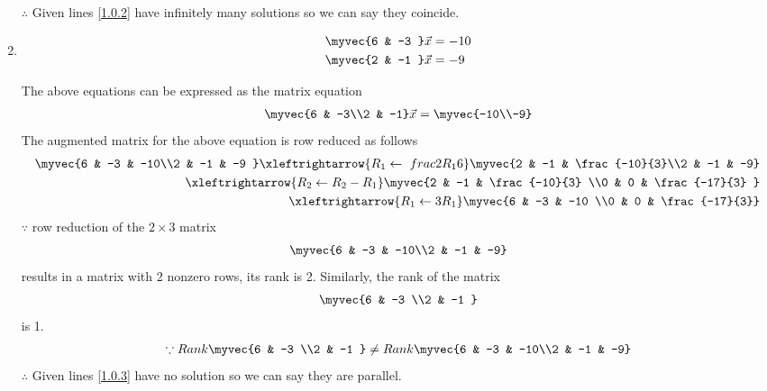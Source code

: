 \documentclass[journal,12pt,twocolumn]{IEEEtran}
\begin{document}
\begin{enumerate}
$\therefore$ Given lines \eqref{1.0.2} have infinitely many solutions so we can say they coincide.


\item
\begin{align}
\begin{split}
\myvec{6 & -3 }\vec{x}&=-10
\\
\myvec{2 & -1 }\vec{x}&=-9
\end{split}
\end{align}

The above equations can be expressed as the matrix equation
\begin{align}
\myvec{6 & -3\\2 & -1} \vec{x} = \myvec{-10\\-9}
\end{align}
%
The augmented matrix for the above equation is row reduced as follows
\begin{align}
\myvec{6 & -3 & -10\\2 & -1 & -9 } 
\xleftrightarrow {R_1\leftarrow \ frac{2R_1}{6}}\myvec{2 & -1 & \frac{-10}{3}\\2 & -1 & -9} 
\\
\xleftrightarrow {R_2\leftarrow R_2-R_1}\myvec{2 & -1 & \frac{-10}{3} \\0 & 0 & \frac{-17}{3} }
\\
\xleftrightarrow {R_1\leftarrow 3R_1}\myvec{6 & -3 & -10 \\0 & 0 & \frac{-17}{3}} 
\\
\end{align}
%
$\because$ row reduction of the $2\times 3$ matrix
%
\begin{align}
\myvec{6 & -3 & -10\\2 & -1 & -9}
\end{align}
%
results in a matrix with 2 nonzero rows, its rank is 2. 
%
Similarly, the rank of the matrix 
\begin{align}
\myvec{6 & -3 \\2 & -1 } 
\end{align}
%
is 1.
%
\begin{align}
\because Rank \myvec{6 & -3 \\2 & -1 } \ne Rank \myvec{6 & -3 & -10\\2 & -1 & -9}
\end{align}
$\therefore$ Given lines \eqref{1.0.3} have no solution so we can say they are parallel.


\end{enumerate}
\end{document}
